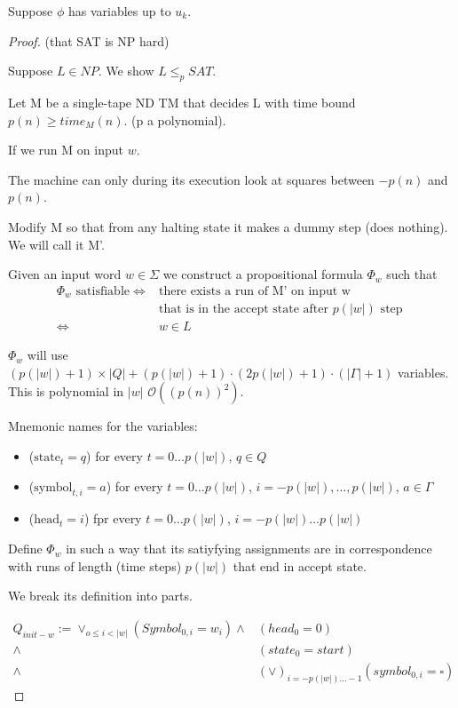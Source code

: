 \documentclass[a4paper,12pt]{article}
\theoremstyle{definition}
\theoremstyle{remark}
\begin{document}
Suppose $\phi$ has variables up to $u_k$.

\begin{proof}(that SAT is NP hard)

    Suppose $L \in NP$. We show $L \leq_p SAT$.

    Let M be a single-tape ND TM that decides L with time bound $p(n) \geq time_M(n)$. (p a polynomial).

    If we run M on input $w$.

    The machine can only during its execution look at squares between $-p(n)$ and $p(n)$.

    Modify M so that from any halting state it makes a dummy step (does nothing). We will call it M'.

    Given an input word $w \in \Sigma$ we construct a propositional formula $\Phi_w$ such that
    \begin{align*}
        \Phi_w  \text{ satisfiable} \iff& \text{there exists a run of M' on input w} \\
                                       &\text{that is in the accept state after } p(|w|) \text{ step } \\
                                   \iff& w \in L
    \end{align*}

    $\Phi_w$ will use $(p(|w|) + 1) \times |Q| + (p(|w|) + 1) \cdot (2p(|w|) +1) \cdot (|\Gamma| + 1)$ variables. This
    is polynomial in $|w|$ $\mathscr{O}((p(n))^2)$.

    Mnemonic names for the variables:
    \begin{itemize}
        \item ($\text{state}_t = q$) for every $t = 0 \dots p(|w|)$, $q \in Q$
        \item ($\text{symbol}_{t, i} = a$) for every $t = 0 \dots p(|w|)$, $i = -p(|w|), \dots, p(|w|)$, $a \in \Gamma$
        \item ($\text{head}_t = i$) fpr every $t = 0 \dots p(|w|)$, $i = -p(|w|) \dots p(|w|)$ 
    \end{itemize}

    Define $\Phi_w$ in such a way that its satiyfying assignments are in correspondence with runs of length
    (time steps) $p(|w|)$ that end in accept state.

    We break its definition into parts.

    \begin{align*}
        Q_{init-w} := \vee_{o \leq i < |w|} (Symbol_{0, i} = w_i) \land& (head_0 = 0) \\
                                                                  \land& (state_0 = start) \\
                                                                  \land& (\vee)_{i = -p(|w|) \dots -1} (symbol_{0, i} = \square)
    \end{align*}
\end{proof}
\end{document}
